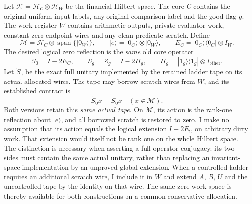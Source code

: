 \documentclass[11pt]{article}
\begin{document}
Let $\mathcal H=\mathcal H_C\otimes\mathcal H_W$ be the financial
Hilbert space. The core $C$ contains the original uniform input labels,
any original comparison label and the good flag $g$. The work register
$W$ contains arithmetic outputs, private evaluator work, constant-zero
endpoint wires and any clean predicate scratch. Define
\begin{equation}
 \mathcal M=\mathcal H_C\otimes\operatorname{span}\{|0_W\rangle\},
 \qquad |e\rangle=|0_C\rangle\otimes|0_W\rangle,
 \qquad E_C=|0_C\rangle\langle0_C|\otimes I_W.
 \label{eq:conjugation-clean-space}
\end{equation}
The desired logical zero reflection is the \emph{same} old core operator
\begin{equation}
 S_0=I-2E_C,
 \qquad S_g=Z_g=I-2\Pi_g,
 \qquad \Pi_g=|1_g\rangle\langle1_g|\otimes I_{\mathrm{other}}.
 \label{eq:conjugation-reflections}
\end{equation}
Let $\widetilde S_0$ be the exact full unitary implemented by the
retained ladder tape on its actual allocated wires. The tape may borrow
scratch wires from $W$, and its established contract is
\begin{equation}
 \widetilde S_0x=S_0x\quad(x\in\mathcal M).
 \label{eq:conjugation-physical-zero-reflection}
\end{equation}
Both versions retain this \emph{same actual tape}. On $\mathcal M$,
its action is the rank-one reflection about $|e\rangle$, and all
borrowed scratch is restored to zero. I make no assumption that its
action equals the logical extension $I-2E_C$ on arbitrary dirty work.
That extension would itself not be rank one on the whole Hilbert
space. The distinction is necessary when asserting a full-operator
conjugacy: its two sides must contain the same actual unitary, rather
than replacing an invariant-space implementation by an unproved
global extension.
When a controlled ladder requires an additional scratch wire, I include
it in $W$ and extend $A$, $B$, $U$ and the uncontrolled tape by the
identity on that wire. The same zero-work space is thereby available
for both constructions on a common conservative allocation.
\end{document}

